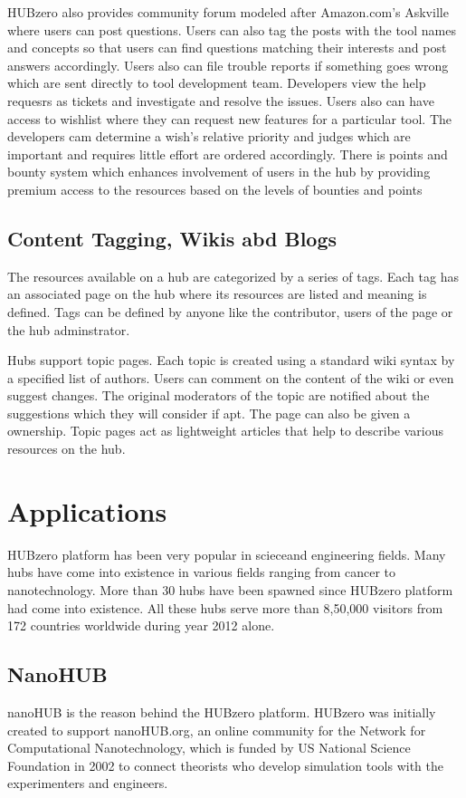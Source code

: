 \documentclass[9pt,twocolumn,twoside]{../../styles/osajnl}
\begin{document}
HUBzero also provides community forum modeled after Amazon.com's
Askville where users can post questions. Users can also tag the posts
with the tool names and concepts so that users can find questions
matching their interests and post answers accordingly. Users also can
file trouble reports if something goes wrong which are sent directly
to tool development team. Developers view the help requesrs \SE as tickets
and investigate and resolve the issues. Users also can have access to
wishlist where they can request new features for a particular
tool. The developers cam determine a wish's relative priority and
judges which are important and requires little effort are ordered
accordingly. There is points and bounty system which enhances
involvement of users in the hub by providing premium access to the
resources based on the levels of bounties and points
\subsection{Content Tagging, Wikis abd Blogs}
The resources available on a hub are categorized by a series of
tags. Each tag has an associated page on the hub where its resources
are listed and meaning is defined. Tags can be defined by anyone like
the contributor, users of the page or the hub adminstrator\SE.

Hubs support topic pages. Each topic is created using a standard wiki
syntax by a specified list of authors. Users can comment on the
content of the wiki or even suggest changes. The original moderators
of the topic are notified about the suggestions which they will
consider if apt. The page can also be given a ownership. Topic pages
act as lightweight articles that help to describe various resources on
the hub\cite{hubzerofeatures}.
\section{Applications}
HUBzero platform has been very popular in sciece\SE and engineering
fields. Many hubs have come into existence in various fields ranging
from cancer to nanotechnology. More than 30 hubs have been spawned
since HUBzero platform had come into existence. All these hubs serve
more than 8,50,000 visitors from 172 countries worldwide during year
2012 alone.
\subsection{NanoHUB}
nanoHUB is the reason behind the HUBzero platform. HUBzero was
initially created to support nanoHUB.org, an online community for the
Network for Computational Nanotechnology, which is funded by US
National Science Foundation in 2002 to connect theorists who develop
simulation tools with the experimenters and engineers.
\end{document}
